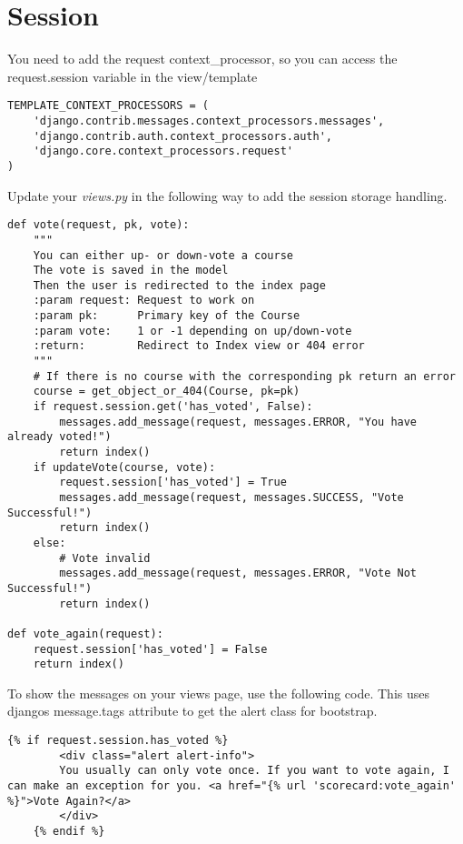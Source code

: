 \section{Session}

You need to add the request context\_processor, so you can access the request.session variable in the view/template
\begin{lstlisting}[style=Python, caption=webtech/config.py, label=lst:config.py1]
TEMPLATE_CONTEXT_PROCESSORS = (
    'django.contrib.messages.context_processors.messages',
    'django.contrib.auth.context_processors.auth',
    'django.core.context_processors.request'
)
\end{lstlisting}

Update your \emph{views.py} in the following way to add the session storage handling.
\begin{lstlisting}[style=Python, caption=Add messages to views, label=lst:views_msg]def vote(request, pk, vote):
    """
    You can either up- or down-vote a course
    The vote is saved in the model
    Then the user is redirected to the index page
    :param request: Request to work on
    :param pk:      Primary key of the Course
    :param vote:    1 or -1 depending on up/down-vote
    :return:        Redirect to Index view or 404 error
    """
    # If there is no course with the corresponding pk return an error
    course = get_object_or_404(Course, pk=pk)
    if request.session.get('has_voted', False):
        messages.add_message(request, messages.ERROR, "You have already voted!")
        return index()
    if updateVote(course, vote):
        request.session['has_voted'] = True
        messages.add_message(request, messages.SUCCESS, "Vote Successful!")
        return index()
    else:
        # Vote invalid
        messages.add_message(request, messages.ERROR, "Vote Not Successful!")
        return index()

def vote_again(request):
    request.session['has_voted'] = False
    return index()
\end{lstlisting}

To show the messages on your views page, use the following code. This uses djangos message.tags attribute to get the alert class for bootstrap.
\begin{lstlisting}[style=HTML, caption=index.html, label=lst:index.html1]
    {% if request.session.has_voted %}
        <div class="alert alert-info">
        You usually can only vote once. If you want to vote again, I can make an exception for you. <a href="{% url 'scorecard:vote_again' %}">Vote Again?</a>
        </div>
    {% endif %}
\end{lstlisting}

